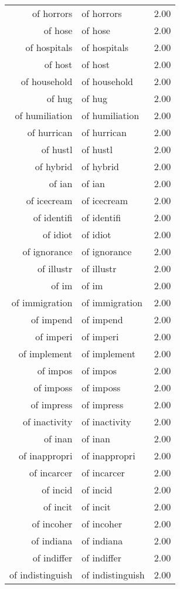 \begin{table}[ht]
\begin{tabular}{rlr}
  of horrors & of horrors & 2.00 \\ 
  of hose & of hose & 2.00 \\ 
  of hospitals & of hospitals & 2.00 \\ 
  of host & of host & 2.00 \\ 
  of household & of household & 2.00 \\ 
  of hug & of hug & 2.00 \\ 
  of humiliation & of humiliation & 2.00 \\ 
  of hurrican & of hurrican & 2.00 \\ 
  of hustl & of hustl & 2.00 \\ 
  of hybrid & of hybrid & 2.00 \\ 
  of ian & of ian & 2.00 \\ 
  of icecream & of icecream & 2.00 \\ 
  of identifi & of identifi & 2.00 \\ 
  of idiot & of idiot & 2.00 \\ 
  of ignorance & of ignorance & 2.00 \\ 
  of illustr & of illustr & 2.00 \\ 
  of im & of im & 2.00 \\ 
  of immigration & of immigration & 2.00 \\ 
  of impend & of impend & 2.00 \\ 
  of imperi & of imperi & 2.00 \\ 
  of implement & of implement & 2.00 \\ 
  of impos & of impos & 2.00 \\ 
  of imposs & of imposs & 2.00 \\ 
  of impress & of impress & 2.00 \\ 
  of inactivity & of inactivity & 2.00 \\ 
  of inan & of inan & 2.00 \\ 
  of inappropri & of inappropri & 2.00 \\ 
  of incarcer & of incarcer & 2.00 \\ 
  of incid & of incid & 2.00 \\ 
  of incit & of incit & 2.00 \\ 
  of incoher & of incoher & 2.00 \\ 
  of indiana & of indiana & 2.00 \\ 
  of indiffer & of indiffer & 2.00 \\ 
  of indistinguish & of indistinguish & 2.00 \\ 

\end{tabular}
\end{table}
